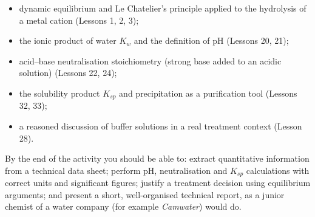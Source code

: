 \documentclass[11pt]{article}
\newcommand{\cle}[1]{{\popxbold\color{popdark}#1}}
\newcounter{popsec}
\newcounter{popsub}
\newcommand{\courssub}[1]{%
  \stepcounter{popsub}%
  \par\vspace{9pt}\noindent{\popxbold\fontsize{11.5}{13}\selectfont\color{popink}{\color{poporange}\thepopsec.\thepopsub}\hspace{6pt}#1}\par\nopagebreak\vspace{4pt}
}
\begin{document}
\begin{itemize}
\item \cle{dynamic equilibrium} and \cle{Le Chatelier's principle} applied to the hydrolysis of a metal cation (Lessons 1, 2, 3);
\item the \cle{ionic product of water} $K_w$ and the definition of \cle{pH} (Lessons 20, 21);
\item \cle{acid--base neutralisation} stoichiometry (strong base added to an acidic solution) (Lessons 22, 24);
\item the \cle{solubility product} $K_{sp}$ and precipitation as a purification tool (Lessons 32, 33);
\item a reasoned discussion of \cle{buffer solutions} in a real treatment context (Lesson 28).
\end{itemize}

By the end of the activity you should be able to: extract quantitative information from a technical data sheet; perform pH, neutralisation and $K_{sp}$ calculations with correct units and significant figures; justify a treatment decision using equilibrium arguments; and present a short, well-organised technical report, as a junior chemist of a water company (for example \emph{Camwater}) would do.

\courssub{Situation}
\end{document}

